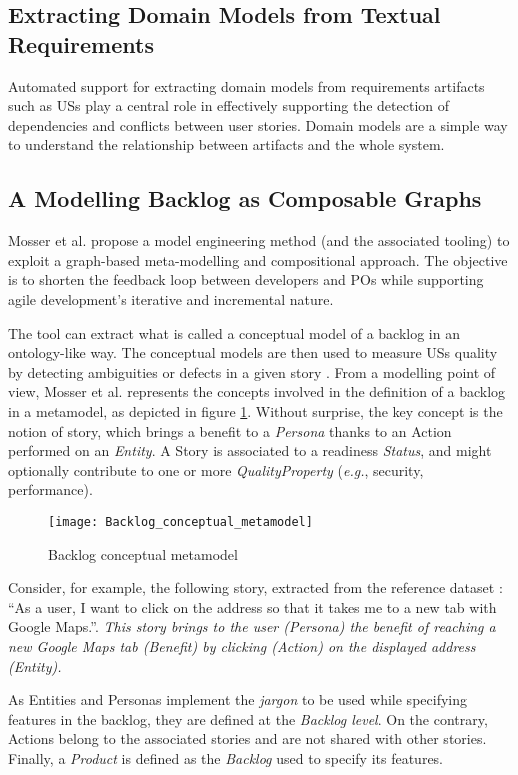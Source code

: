\subsection{Extracting Domain Models from Textual Requirements}\label{dmodel}
Automated support for extracting domain models from requirements artifacts such as USs play a central role in effectively supporting the detection of dependencies and conflicts between user stories. Domain models are a simple way to understand the relationship between artifacts and the whole system. 
\subsection*{A Modelling Backlog as Composable Graphs} \label{composable_graph}
Mosser et al. propose a model engineering method (and the associated tooling) to exploit a graph-based meta-modelling and compositional approach. The objective is to shorten the feedback loop between developers and POs while supporting agile development’s iterative and incremental nature. 

The tool can extract what is called a conceptual model of a backlog in an ontology-like way. The conceptual models are then used to measure USs quality by detecting ambiguities or defects in a given story \cite{mosser2022modelling}.
From a modelling point of view, Mosser et al. represents the concepts involved in the deﬁnition of a backlog in a metamodel, as depicted in figure \ref{fig:conceptual_metamodel}. Without surprise, the key concept is the notion of story, which brings a benefit to a \emph{Persona} thanks to an Action performed on an \emph{Entity}. A Story is associated to a readiness \emph{Status}, and might optionally contribute to one or more \emph{QualityProperty} (\emph{e.g.}, security, performance).
\begin{figure}
\center
\texttt{[image: Backlog\_conceptual\_metamodel]}
\caption{Backlog conceptual metamodel \cite{mosser2022modelling}}\label{fig:conceptual_metamodel}
\end{figure}

Consider, for example, the following story, extracted from the reference dataset \cite{Dalpiaz2018}: \enquote{As a user, I want to click on the address so that it takes me to a new tab with Google Maps.}. \emph{This story brings to the user (Persona) the benefit of reaching a new Google Maps tab (Benefit) by clicking (Action) on the displayed address (Entity).}

As Entities and Personas implement the \emph{jargon} to be used while specifying features in the backlog, they are deﬁned at the \emph{Backlog level}. On the contrary, Actions belong to the associated stories and are not shared with other stories. Finally, a \emph{Product} is deﬁned as the \emph{Backlog} used to specify its features.

